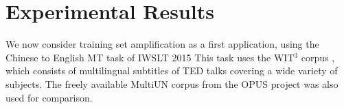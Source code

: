 






\section{Experimental Results}
\label{supersec:experimental_results}

\label{sec:experiments}
We now consider training set amplification as a first application, using the Chinese to English MT task of IWSLT 2015 
This task uses the WIT$^3$ corpus , which consists of multilingual subtitles of TED talks covering a wide variety of subjects. 
The freely available MultiUN corpus  from the OPUS project  was also used for comparison.

